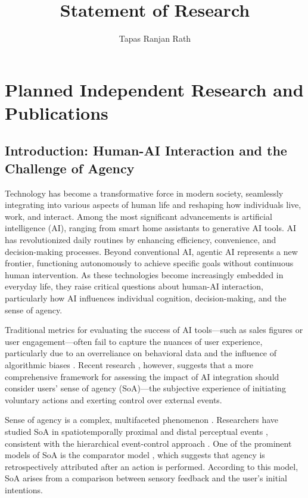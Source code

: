 \documentclass[12pt]{article}
\title{Statement of Research}
\author{Tapas Ranjan Rath}
\date{}
\begin{document}
\maketitle

\section{Planned Independent Research and Publications}

\subsection{Introduction: Human-AI Interaction and the Challenge of Agency}

Technology has become a transformative force in modern society, seamlessly integrating into various aspects of human life and reshaping how individuals live, work, and interact. Among the most significant advancements is artificial intelligence (AI), ranging from smart home assistants to generative AI tools. AI has revolutionized daily routines by enhancing efficiency, convenience, and decision-making processes. Beyond conventional AI, agentic AI represents a new frontier, functioning autonomously to achieve specific goals without continuous human intervention. As these technologies become increasingly embedded in everyday life, they raise critical questions about human-AI interaction, particularly how AI influences individual cognition, decision-making, and the sense of agency.

Traditional metrics for evaluating the success of AI tools—such as sales figures or user engagement—often fail to capture the nuances of user experience, particularly due to an overreliance on behavioral data and the influence of algorithmic biases \citep{NBERw30981, ekstrand2016behaviorism}. Recent research \citep{cornelio2022sense, berberian2019man}, however, suggests that a more comprehensive framework for assessing the impact of AI integration should consider users’ sense of agency (SoA)—the subjective experience of initiating voluntary actions and exerting control over external events.

Sense of agency is a complex, multifaceted phenomenon \citep{pacherie2011self}. Researchers have studied SoA in spatiotemporally proximal and distal perceptual events \citep{kumar2014naturalizing, kumar2017multi}, consistent with the hierarchical event-control approach \citep{jordan2003emergence}. One of the prominent models of SoA is the comparator model \citep{wolpert1995internal, miall1996forward}, which suggests that agency is retrospectively attributed after an action is performed. According to this model, SoA arises from a comparison between sensory feedback and the user’s initial intentions. 
\end{document}
